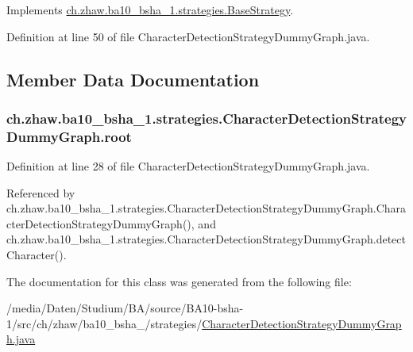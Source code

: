 Implements \hyperlink{classch_1_1zhaw_1_1ba10__bsha__1_1_1strategies_1_1BaseStrategy_a0496e8fd0099a5f0f7765322d7e752a9}{ch.zhaw.ba10\_\-bsha\_\-1.strategies.BaseStrategy}.

Definition at line 50 of file CharacterDetectionStrategyDummyGraph.java.

\subsection{Member Data Documentation}
\hypertarget{classch_1_1zhaw_1_1ba10__bsha__1_1_1strategies_1_1CharacterDetectionStrategyDummyGraph_a734b7506e0104434524a5cb0db0ad7d4}{
\subsubsection[{root}]{ {\bf ch.zhaw.ba10\_\-bsha\_\-1.strategies.CharacterDetectionStrategyDummyGraph.root}}}
\label{classch_1_1zhaw_1_1ba10__bsha__1_1_1strategies_1_1CharacterDetectionStrategyDummyGraph_a734b7506e0104434524a5cb0db0ad7d4}


Definition at line 28 of file CharacterDetectionStrategyDummyGraph.java.

Referenced by ch.zhaw.ba10\_\-bsha\_\-1.strategies.CharacterDetectionStrategyDummyGraph.CharacterDetectionStrategyDummyGraph(), and ch.zhaw.ba10\_\-bsha\_\-1.strategies.CharacterDetectionStrategyDummyGraph.detectCharacter().

The documentation for this class was generated from the following file:\begin{DoxyCompactItemize}
\item 
/media/Daten/Studium/BA/source/BA10-\/bsha-\/1/src/ch/zhaw/ba10\_\-bsha\_/strategies/\hyperlink{CharacterDetectionStrategyDummyGraph_8java}{CharacterDetectionStrategyDummyGraph.java}\end{DoxyCompactItemize}
